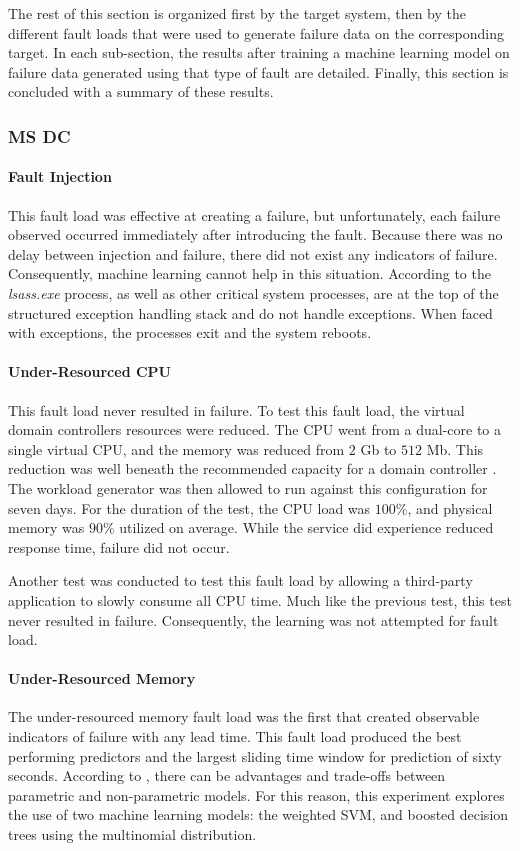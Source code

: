 The rest of this section is organized first by the target system, then by the
different fault loads that were used to generate failure data on the
corresponding target.  In each sub-section, the results after training a
machine learning model on failure data generated using that type of fault are
detailed.  Finally, this section is concluded with a summary of these results.

\subsubsection{\ac{MS} \ac{DC}}
\paragraph{Fault Injection}
This fault load was effective at creating a failure, but unfortunately, each
failure observed occurred immediately after introducing the fault.  Because
there was no delay between injection and failure, there did not exist any
indicators of failure.  Consequently, machine learning cannot help in this
situation.  According to \citet{russinovich2009} the
\emph{lsass.exe} process, as well as other critical system processes, are at
the top of the structured exception handling stack and do not handle
exceptions.  When faced with exceptions, the processes exit and the system
reboots.

\paragraph{Under-Resourced \ac{CPU}}
This fault load never resulted in failure.  To test this fault load, the
virtual domain controllers resources were reduced.  The \ac{CPU} went from a
dual-core to a single virtual CPU, and the memory was reduced from $2$ Gb to
$512$ Mb.  This reduction was well beneath the recommended capacity for a
domain controller \citep{mak12}.  The workload generator was then allowed to
run against this configuration for seven days.  For the duration of the test,
the \ac{CPU} load was $100\%$, and physical memory was $90\%$ utilized on
average.  While the service did experience reduced response time, failure did
not occur.

Another test was conducted to test this fault load by allowing a third-party
application to slowly consume all \ac{CPU} time.  Much like the previous test,
this test never resulted in failure.  Consequently, the learning was not
attempted for fault load.

\paragraph{Under-Resourced Memory}
The under-resourced memory fault load was the first that created observable
indicators of failure with any lead time.  This fault load produced the best
performing predictors and the largest sliding time window for prediction of
sixty seconds.  According to \citet{islr}, there can be advantages and
trade-offs between parametric and non-parametric models.  For this reason, this
experiment explores the use of two machine learning models: the weighted
\ac{SVM}, and boosted decision trees using the multinomial distribution.  


